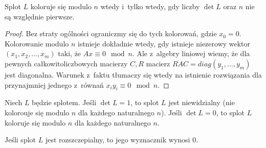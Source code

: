 

\begin{proposition}
    \label{prp:colour_det}
    Splot $L$ koloruje się modulo $n$ wtedy i~tylko wtedy, gdy liczby $\det L$ oraz $n$ nie są względnie pierwsze.
\end{proposition}

\begin{proof}
    Bez straty ogólności ograniczmy się do tych kolorowań, gdzie $x_0 = 0$.
    Kolorowanie modulo $n$ istnieje dokładnie wtedy, gdy istnieje niezerowy wektor $(x_1, x_2, \ldots, x_m)$ taki, że $Ax \equiv 0 \mod n$.
    Ale z~algebry liniowej wiemy, że dla pewnych całkowitoliczbowych macierzy $C, R$ macierz $RAC = diag(y_1, \ldots, y_m)$ jest diagonalna.
    Warunek z~faktu tłumaczy się wtedy na istnienie rozwiązania dla przynajmniej jednego z~równań $x_iy_i \equiv 0 \mod n$.
\end{proof}

\begin{corollary}
    Niech $L$ będzie splotem.
    Jeśli $\det L = 1$, to splot $L$ jest niewidzialny (nie kolorouje się modulo $n$ dla każdego naturalnego $n$).
    Jeśli $\det L = 0$, to splot $L$ koloruje się modulo $n$ dla każdego naturalnego $n$.
\end{corollary}

\begin{corollary}
    Jeśli splot $L$ jest rozszczepialny, to jego wyznacznik wynosi $0$.
\end{corollary}

